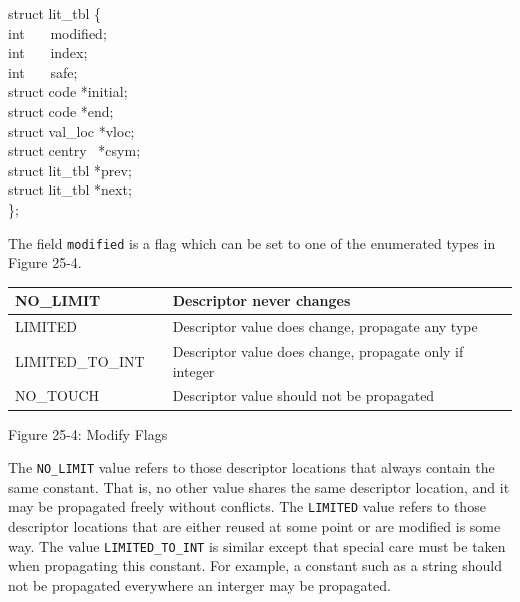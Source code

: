 \begin{iconcode}
struct lit\_tbl \{ \\
\> int \ \ \ modified; \\
\> int \ \ \ index; \\
\> int \ \ \ safe; \\
\> struct code *initial; \\
\> struct code *end; \\
\> struct val\_loc *vloc; \\
\> struct centry \ *csym; \\
\> struct lit\_tbl *prev; \\
\> struct lit\_tbl *next; \\
\};
\end{iconcode}

The field \texttt{modified} is a flag which can be set to one of the
enumerated types in Figure 25-4.

\begin{center}
\tabletail{}
\tablelasttail{}
\begin{xtabular}{|m{1.4302598in}|m{0.41155985in}|m{3.7115598in}|}
\hline
{\ttfamily NO\_LIMIT} &
 &
 Descriptor never changes\\\hline
{\ttfamily LIMITED} &
 &
 Descriptor value does change, propagate any type\\\hline
{\ttfamily LIMITED\_TO\_INT} &
 &
 Descriptor value does change, propagate only if integer\\\hline
{\ttfamily NO\_TOUCH} &
 &
 Descriptor value should not be propagated\\\hline
\end{xtabular}
\end{center}
{\centering{}
Figure 25-4: Modify Flags
\par}


The \texttt{NO\_LIMIT} value refers to those descriptor locations that
always contain the same constant. That is, no other value shares the
same descriptor location, and it may be propagated freely without
conflicts. The \texttt{LIMITED} value refers to those descriptor
locations that are either reused at some point or are modified is some
way. The value \texttt{LIMITED\_TO\_INT} is similar except that
special care must be taken when propagating this constant. For
example, a constant such as a string should not be propagated
everywhere an interger may be propagated.

